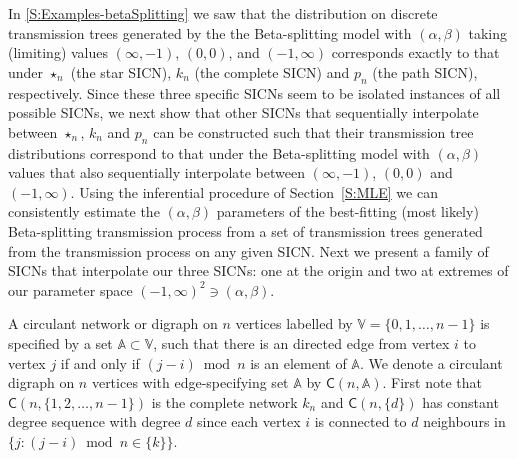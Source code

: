 \documentclass[review]{elsarticle}
\numberwithin{equation}{section}
\let\orgautoref\autoref
\renewcommand{\autoref}
        {\def\equationautorefname{Eq.}%
         \def\figureautorefname{Fig.}%
         \def\subfigureautorefname{Fig.}%
         \def\sectionautorefname{Sect.}%
         \def\subsectionautorefname{Sect.}%
         \def\subsubsectionautorefname{Sect.}%
         \def\Itemautorefname{item}%
         \def\tableautorefname{Table}%
         \def\propositionautorefname{Prop.}%
         \def\corollaryautorefname{Corollary}%
         \def\theoremautorefname{Theorem}%
         \def\remarkautorefname{Remark}%
         \def\lemmaautorefname{Lemma}%
         \def\proofofautorefname{Proof}%
         \def\exampleautorefname{Example}%
         \orgautoref}
\begin{document}
In \autoref{S:Examples-betaSplitting} we saw that the distribution on discrete transmission trees generated by the the Beta-splitting model with $(\alpha,\beta)$ taking (limiting) values $(\infty,-1)$, $(0,0)$, and $(-1,\infty)$ corresponds exactly to that under $\star_n$ (the star SICN), $k_n$ (the complete SICN) and $p_n$ (the path SICN), respectively.  
Since these three specific SICNs seem to be isolated instances of all possible SICNs, 
we next show that other SICNs that sequentially interpolate between $\star_n$, $k_n$ and $p_n$ can be constructed such that their transmission tree distributions correspond to that under the Beta-splitting model with $(\alpha,\beta)$ values that also sequentially interpolate between $(\infty,-1)$, $(0,0)$ and $(-1,\infty)$.  
Using the inferential procedure of Section~\ref{S:MLE} we can consistently estimate the $(\alpha,\beta)$ parameters of the best-fitting (most likely) Beta-splitting transmission process from a set of transmission trees generated from the transmission process on any given SICN.  
Next we present a family of SICNs that interpolate our three SICNs: one at the origin and two at extremes of our parameter space $(-1,\infty)^2 \ni (\alpha,\beta)$.

A circulant network or digraph on $n$ vertices labelled by $\mathbb{V} = \{0,1,\ldots,n-1\}$ is specified by a set $\mathbb{A} \subset \mathbb{V}$, such that there is an directed edge from vertex $i$ to vertex $j$ if and only if $(j-i) \bmod n$ is an element of $\mathbb{A}$.  
We denote a circulant digraph on $n$ vertices with edge-specifying set $\mathbb{A}$ by $\mathsf{C}(n,\mathbb{A})$.  
First note that $\mathsf{C}(n,\{1,2,\ldots,n-1\})$ is the complete network $k_n$ and $\mathsf{C}(n,\{d\})$ has constant degree sequence with degree $d$ since each vertex $i$ is connected to $d$ neighbours in $\{j : (j-i) \bmod n \in \{k\}\}$.  
\end{document}
